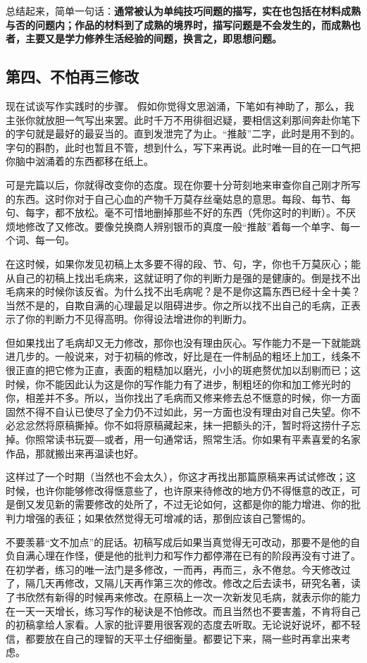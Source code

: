 \documentclass[fontset=fandol,12pt,a5paper]{ctexbook}
\begin{document}
总结起来，简单一句话：\textbf{通常被认为单纯技巧间题的描写，实在也包括在材料成熟与否的问题内；作品的材料到了成熟的境界时，描写问题是不会发生的，而成熟也者，主要又是学力修养生活经验的间题，换言之，即思想问题。}

\subsection{第四、不怕再三修改}
现在试谈写作实践时的步骤。
假如你觉得文思汹涌，下笔如有神助了，那么，我主张你就放胆一气写出来罢。此时千万不用徘徊迟疑，要相信这刹那间奔赴你笔下的字句就是最好的最妥当的。直到发泄完了为止。“推敲”二字，此时是用不到的。字句的斟酌，此时也暂且不管，想到什么，写下来再说。此时唯一目的在一口气把你脑中汹涌着的东西都移在纸上。

可是完篇以后，你就得改变你的态度。现在你要十分苛刻地来审查你自己刚才所写的东西。这时你对于自己心血的产物千万莫存丝毫姑息的意思。每段、每节、每句、每字，都不放松。毫不可惜地删掉那些不好的东西（凭你这时的判断）。不厌烦地修改了又修改。要像兑换商人辨别银币的真度一般“推敲”着每一个单字、每一个词、每一句。

在这时候，如果你发见初稿上太多要不得的段、节、句，字，你也千万莫灰心；能从自己的初稿上找出毛病来，这就证明了你的判断力是强的是健康的。倒是找不出毛病来的时候你该反省。为什么找不出毛病呢？是不是你这篇东西已经十全十美？当然不是的，自欺自满的心理最足以阻碍进步。你之所以找不出自己的毛病，正表示了你的判断力不见得高明。你得设法增进你的判断力。

但如果找出了毛病却又无力修改，那你也没有理由灰心。写作能力不是一下就能跳进几步的。一般说来，对于初稿的修改，好比是在一件制品的粗坯上加工，线条不很正直的把它修为正直，表面的粗糙加以磨光，小小的斑疤赘优加以刮剔而已；这时候，你不能因此认为这是你的写作能力有了进步，制粗坯的你和加工修光时的你，相差并不多。所以，当你找出了毛病而又修来修去总不惬意的时候，你一方面固然不得不自认已使尽了全力仍不过如此，另一方面也没有理由对自己失望。你不必忿忿然将原稿撕掉。你不如将原稿藏起来，抹一把额头的汗，暂时将这捞什子忘掉。你照常读书玩耍―或者，用一句通常话，照常生活。你如果有平素喜爱的名家作品，那就搬出来再温读也好。

这样过了一个时期（当然也不会太久），你这才再找出那篇原稿来再试试修改；这时候，也许你能够修改得惬意些了，也许原来待修改的地方仍不得惬意的改正，可是倒又发见新的需要修改的处所了，不过无论如何，这都是你的能力增进、你的批判力增强的表征；如果依然觉得无可增减的话，那倒应该自己警惕的。

不要羡慕“文不加点”的屁话。初稿写成后如果当真觉得无可改动，那要不是他的自负自满心理在作怪，便是他的批判力和写作力都停滞在已有的阶段再没有寸进了。在初学者，练习的唯一法门是多修改，一而再，再而三，永不倦怠。今天修改过了，隔几天再修改，又隔儿天再作第三次的修改。修改之后去读书，研究名著，读了书欣然有新得的时候再来修改。在原稿上一次一次新发见毛病，就表示你的能力在一天一天增长，练习写作的秘诀是不怕修改。而且当然也不要害羞，不肯将自己的初稿拿给人家看。人家的批评要用很客观的态度去听取。无论说好说坏，都不轻信，都要放在自己的理智的天平土仔细衡量。都要记下来，隔一些时再拿出来考虑。
\end{document}
